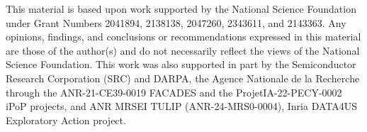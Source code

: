 This material is based upon work supported by the National Science Foundation
under Grant Numbers 
2041894, %
2138138, %
2047260, %
2343611, %
and
2143363. %
%
Any opinions, findings, and conclusions or
recommendations expressed in this material are those of the author(s) and do not
necessarily reflect the views of the National Science Foundation.
%
This work was also supported in part by the Semiconductor Research Corporation (SRC) and DARPA, %
%
the Agence Nationale de la Recherche through the ANR-21-CE39-0019 FACADES and the ProjetIA-22-PECY-0002 iPoP projects,  %
%
and ANR MRSEI TULIP (ANR-24-MRS0-0004), Inria  DATA4US Exploratory Action project. %